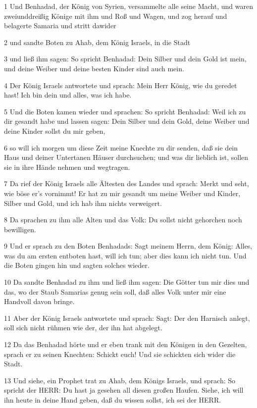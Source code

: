 \par 1 Und Benhadad, der König von Syrien, versammelte alle seine Macht, und waren zweiunddreißig Könige mit ihm und Roß und Wagen, und zog herauf und belagerte Samaria und stritt dawider
\par 2 und sandte Boten zu Ahab, dem König Israels, in die Stadt
\par 3 und ließ ihm sagen: So spricht Benhadad: Dein Silber und dein Gold ist mein, und deine Weiber und deine besten Kinder sind auch mein.
\par 4 Der König Israels antwortete und sprach: Mein Herr König, wie du geredet hast! Ich bin dein und alles, was ich habe.
\par 5 Und die Boten kamen wieder und sprachen: So spricht Benhadad: Weil ich zu dir gesandt habe und lassen sagen: Dein Silber und dein Gold, deine Weiber und deine Kinder sollst du mir geben,
\par 6 so will ich morgen um diese Zeit meine Knechte zu dir senden, daß sie dein Haus und deiner Untertanen Häuser durchsuchen; und was dir lieblich ist, sollen sie in ihre Hände nehmen und wegtragen.
\par 7 Da rief der König Israels alle Ältesten des Landes und sprach: Merkt und seht, wie böse er's vornimmt! Er hat zu mir gesandt um meine Weiber und Kinder, Silber und Gold, und ich hab ihm nichts verweigert.
\par 8 Da sprachen zu ihm alle Alten und das Volk: Du sollst nicht gehorchen noch bewilligen.
\par 9 Und er sprach zu den Boten Benhadads: Sagt meinem Herrn, dem König: Alles, was du am ersten entboten hast, will ich tun; aber dies kann ich nicht tun. Und die Boten gingen hin und sagten solches wieder.
\par 10 Da sandte Benhadad zu ihm und ließ ihm sagen: Die Götter tun mir dies und das, wo der Staub Samarias genug sein soll, daß alles Volk unter mir eine Handvoll davon bringe.
\par 11 Aber der König Israels antwortete und sprach: Sagt: Der den Harnisch anlegt, soll sich nicht rühmen wie der, der ihn hat abgelegt.
\par 12 Da das Benhadad hörte und er eben trank mit den Königen in den Gezelten, sprach er zu seinen Knechten: Schickt euch! Und sie schickten sich wider die Stadt.
\par 13 Und siehe, ein Prophet trat zu Ahab, dem Königs Israels, und sprach: So spricht der HERR: Du hast ja gesehen all diesen großen Haufen. Siehe, ich will ihn heute in deine Hand geben, daß du wissen sollst, ich sei der HERR.
